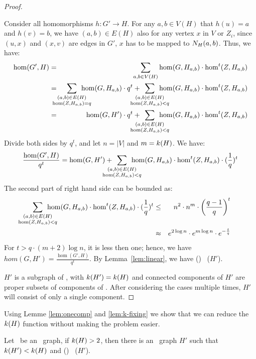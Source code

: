 \begin{proof}
\begin{itemize}
Consider all homomorphisms \(h: G'\to H\)\@.
For any \(a,b\in V(H)\) that \(h(u)=a\) and \(h(v)=b\), we have \((a,b)\in E(H)\) also
for any vertex \(x\) in \(V\) or \(Z_i\), since \((u,x)\) and \((x,v)\) are edges in \(G'\), 
\(x\) has to be mapped to \(N_{H}({a},{b})\)\@. Thus, we have:
\begin{eqnarray*}
\hom(G',H) &=&
\sum_{a,b\in V(H)} \hom(G,H_{a,b}) \cdot \hom^t(Z, H_{a,b}) \\
&=&
\bigsum{\substack{(a,b)\in E(H)\\ \hom(Z, H_{a,b}) = q}} \hom(G, H_{a,b}) \cdot q^t + 
\bigsum{\substack{(a,b)\in E(H)\\ \hom(Z, H_{a,b}) < q}} 
\hom(G, H_{a,b}) \cdot \hom^t(Z,H_{a,b})\\
&=&
\hom(G,H') \cdot q^t + \bigsum{\substack{(a,b)\in E(H)\\ \hom(Z, H_{a,b}) < q}} 
\hom(G, H_{a,b}) \cdot \hom^t(Z,H_{a,b})
\end{eqnarray*}
Divide both sides by \(q^t\), and let \(n=|V|\) and \(m=k(H)\)\@. We have:
\[
\frac{\hom(G',H)}{q^t} = 
\hom(G,H') + 
\bigsum{\substack{(a,b)\in E(H)\\ \hom(Z, H_{a,b}) < q}} 
\hom(G, H_{a,b}) \cdot \hom^t(Z,H_{a,b}) \cdot (\frac{1}{q})^t
\]
The second part of right hand side can be bounded as:
\begin{eqnarray*}
\bigsum{\substack{(a,b)\in E(H)\\ \hom(Z, H_{a,b}) < q}} 
\hom(G, H_{a,b}) \cdot \hom^t(Z,H_{a,b}) \cdot (\frac{1}{q})^t & \le &
n^2 \cdot n^m \cdot \left(\frac{q-1}{q}\right)^t\\
& \approx & e ^ {2\log n} \cdot e^{m\log n} \cdot e^{-\frac{t}{q}} \\
\end{eqnarray*}
For \(t > q \cdot (m+2)\log n\), it is less then one; hence, we have
\(hom(G,H')=\frac{\hom(G',H)}{q^t}\)\@. By Lemma~\ref{lem:linear},
we have \chom(\mH) \mapge\ \chom(\(H'\)). 
\end{itemize}
\(H'\) is a subgraph of \mH, with \(k(H')=k(H)\) and connected components of \(H'\)
are proper subsets of components of \mH\@. After considering the cases multiple times,
\(H'\) will consist of only a single component.
\end{proof}

Using Lemme \ref{lem:onecomp} and \ref{lem:k-fixing} we show that we can reduce the 
\(k(H)\) function without making the problem easier.

\begin{lemma} \label{lem:k-reduction}
Let \mH\ be an \RBA\ graph, if \(k(H) > 2\), then
there is an \RBA\ graph \(H'\) such that \(k(H') < k(H)\)
and \chom(\mH) \mapge\ \chom(\(H'\))\@.
\end{lemma}


